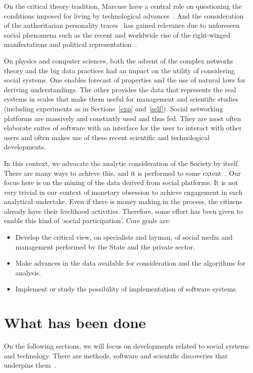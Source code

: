 \documentclass[letterpaper,10pt]{article}
\begin{document}
On the critical theory tradition,
Marcuse have a central role on
questioning the conditions
imposed for living by technological advances~\cite{m1,m2,m3,m4}.
And the consideration of the authoritarian personality traces~\cite{au}
has gained relevance due to unforeseen social phenomena
such as the recent and worldwide rise of the right-winged manifestations
and political representation~\cite{rise,rise2}.

On physics and computer sciences,
both the advent of the complex networks
theory and the big data practices
had an impact on the utility of considering
social systems.
One enables forecast of properties
and the use of natural laws for deriving understandings.
The other provides the data that represents the real systems
in scales that make them useful for management and
scientific studies (including experiments as in Sections~\ref{exp} and~\ref{self}).
Social networking platforms are massively and constantly used and thus fed.
They are most often elaborate suites of software with
an interface for the user to interact with other users
and often makes use of these recent scientific and technological
developments.\cite{tese}

In this context,
we advocate the analytic consideration
of the Society by itself.
There are many ways to achieve this,
and it is performed to some extent~\cite{scriptLattes,losd,p5,an,an2}.
Our focus here is on the mining of the data
derived from social platforms.
It is not very trivial in our context
of monetary obsession to achieve engagement
in such analytical undertake.
Even if there is money making in the process,
the citizens already have their livelihood activities.
Therefore, some effort has been given to
enable this kind of `social participation'.
Core goals are:
\begin{itemize}
	\item Develop the critical view, on specialists and layman,
		of social media and
		management performed by the State and the private sector.
	\item Make advances in the data available for consideration
		and the algorithms for analysis.
	\item Implement or study the possibility of implementation
		of software systems.
\end{itemize}

\section{What has been done}
On the following sections, we will focus on
developments related to social systems and technology.
There are methods, software and scientific discoveries
that underpins them~\cite{stab,tese,kolm}.
\end{document}
